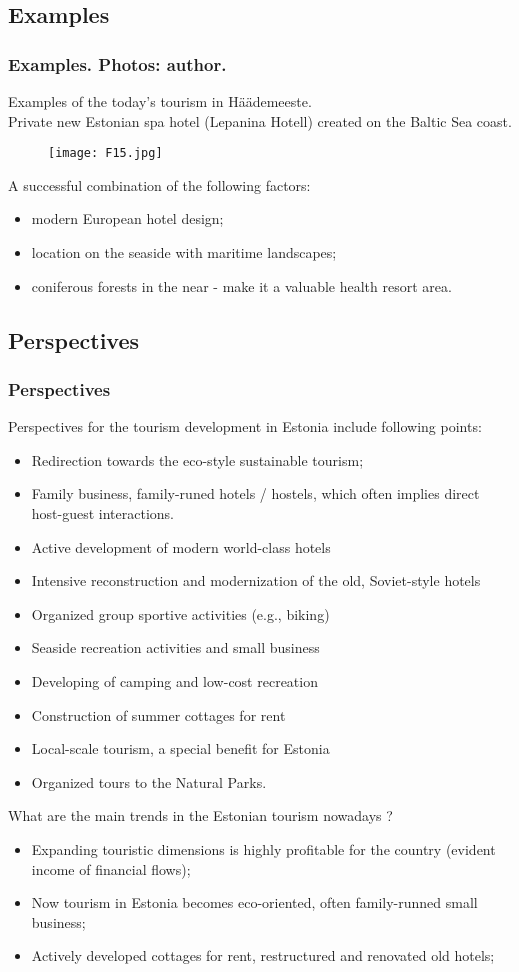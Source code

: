 \documentclass[pdflatex,compress,8pt,
	xcolor={dvipsnames,dvipsnames,svgnames,x11names,table},
]{beamer}
\begin{document}
\subsection{Examples}
\begin{frame}\frametitle{Examples. Photos: author.}
Examples of the today's tourism in Häädemeeste.\\
Private new Estonian spa hotel (Lepanina Hotell) created on the Baltic Sea coast.
\begin{figure}[H]
	\centering
		\texttt{[image: F15.jpg]}
\end{figure}
A successful combination of the following factors:
\begin{itemize}
	\item modern European hotel design;
	\item location on the seaside with maritime landscapes;
	\item coniferous forests in the near - make it a valuable health resort area. 
\end{itemize}
\end{frame}

\subsection{Perspectives}
\begin{frame}\frametitle{Perspectives}
 Perspectives for the tourism development in Estonia include following points:
\begin{itemize}
	\item Redirection towards the eco-style sustainable tourism;
	\item Family business, family-runed hotels / hostels, which often implies direct host-guest interactions.
	\item Active development of modern world-class hotels
	\item Intensive reconstruction and modernization of the old, Soviet-style hotels
	\item Organized group sportive activities (e.g., biking)
	\item Seaside recreation activities and small business
	\item Developing of camping and low-cost recreation
	\item Construction of summer cottages for rent
	\item Local-scale tourism, a special benefit for Estonia
	\item Organized tours to the Natural Parks.
\end{itemize}
What are the main trends in the Estonian tourism nowadays ?
\begin{itemize}
	\item Expanding touristic dimensions is highly profitable for the country (evident income of financial flows);
	\item Now tourism in Estonia becomes eco-oriented, often family-runned small business;
	\item Actively developed cottages for rent, restructured and renovated old hotels;
\end{itemize}
\end{frame}
\end{document}
